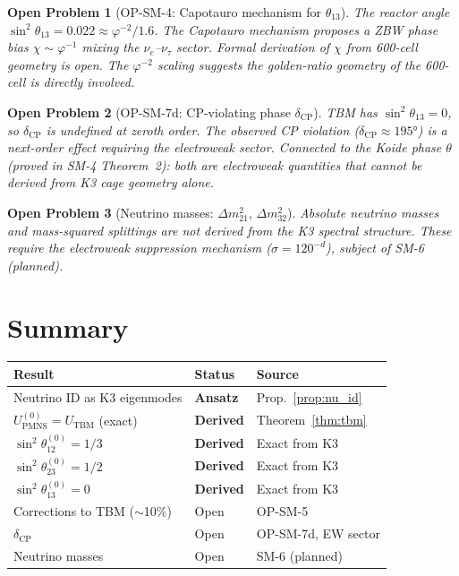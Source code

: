\documentclass[11pt]{article}
\newtheorem{openproblem}{Open Problem}
\newcommand{\phig}{\varphi}
\newcommand{\PMNS}{\mathrm{PMNS}}
\newcommand{\CP}{\mathrm{CP}}
\newcommand{\TBM}{\mathrm{TBM}}
\begin{document}
\begin{openproblem}[OP-SM-4: Capotauro mechanism for $\theta_{13}$]
The reactor angle $\sin^2\theta_{13} = 0.022 \approx \phig^{-2}/1.6$.
The Capotauro mechanism proposes a ZBW phase bias $\chi \sim \phig^{-1}$
mixing the $\nu_e$--$\nu_\tau$ sector.  Formal derivation of $\chi$
from 600-cell geometry is open.  The $\phig^{-2}$ scaling suggests
the golden-ratio geometry of the 600-cell is directly involved.
\end{openproblem}

\begin{openproblem}[OP-SM-7d: CP-violating phase $\delta_\CP$]
TBM has $\sin^2\theta_{13} = 0$, so $\delta_\CP$ is undefined at
zeroth order.  The observed CP violation ($\delta_\CP \approx 195°$)
is a next-order effect requiring the electroweak sector.  Connected
to the Koide phase $\theta$ (proved in SM-4 Theorem~2): both are
electroweak quantities that cannot be derived from K3 cage geometry
alone.
\end{openproblem}

\begin{openproblem}[Neutrino masses: $\Delta m_{21}^2$, $\Delta m_{32}^2$]
Absolute neutrino masses and mass-squared splittings are not derived
from the K3 spectral structure.  These require the electroweak
suppression mechanism ($\sigma = 120^{-d}$), subject of SM-6
(planned).
\end{openproblem}

\section{Summary}

\begin{center}
\renewcommand{\arraystretch}{1.3}
\begin{tabular}{p{5.5cm}lp{4.5cm}}
\toprule
Result & Status & Source \\
\midrule
Neutrino ID as K3 eigenmodes & \textbf{Ansatz} & Prop.~\ref{prop:nu_id} \\
$U_\PMNS^{(0)} = U_\TBM$ (exact) & \textbf{Derived} & Theorem~\ref{thm:tbm} \\
$\sin^2\theta_{12}^{(0)} = 1/3$ & \textbf{Derived} & Exact from K3 \\
$\sin^2\theta_{23}^{(0)} = 1/2$ & \textbf{Derived} & Exact from K3 \\
$\sin^2\theta_{13}^{(0)} = 0$ & \textbf{Derived} & Exact from K3 \\
Corrections to TBM ($\sim$10\%) & Open & OP-SM-5 \\
$\delta_\CP$ & Open & OP-SM-7d, EW sector \\
Neutrino masses & Open & SM-6 (planned) \\
\bottomrule
\end{tabular}
\end{center}
\end{document}
